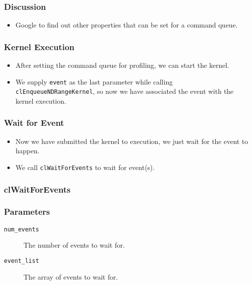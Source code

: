 \documentclass{beamer}
\begin{document}
\begin{frame}
  \frametitle{Discussion}
  \begin{itemize}
    \item Google to find out other properties that can be set for a
      command queue.
  \end{itemize}
\end{frame}

\begin{frame}
  \frametitle{Kernel Execution}
  \begin{itemize}
  \item After setting the command queue for profiling, we can start
    the kernel.
  \item We supply {\tt event} as the last parameter while calling
    {\tt clEnqueueNDRangeKernel}, so now we have associated the
    event with the kernel execution.
  \end{itemize}
\end{frame}

\begin{frame}
\end{frame}

\begin{frame}
\end{frame}

\begin{frame}
  \frametitle{Wait for Event}
  \begin{itemize}
    \item Now we have submitted the kernel to execution, we just wait
      for the event to happen.
    \item We call {\tt clWaitForEvents} to wait for event(s).
  \end{itemize}
\end{frame}

\begin{frame}
  \frametitle{clWaitForEvents}
\end{frame}

\begin{frame}
  \frametitle{Parameters}
  \begin{description}
  \item [\tt num\_events] The number of events to wait for.
  \item [\tt event\_list] The array of events to wait for.
  \end{description}
\end{frame}
\end{document}

